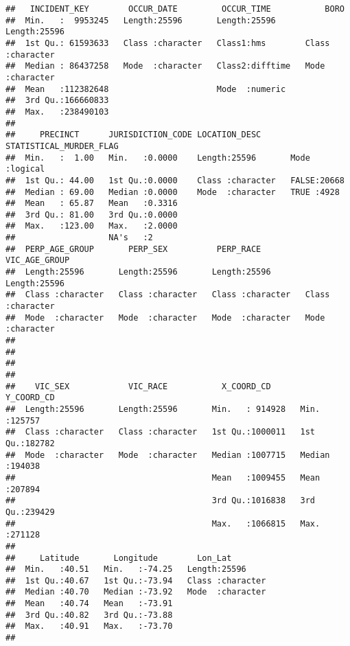 \documentclass[
]{article}
\begin{document}
\begin{verbatim}
##   INCIDENT_KEY        OCCUR_DATE         OCCUR_TIME           BORO          
##  Min.   :  9953245   Length:25596       Length:25596      Length:25596      
##  1st Qu.: 61593633   Class :character   Class1:hms        Class :character  
##  Median : 86437258   Mode  :character   Class2:difftime   Mode  :character  
##  Mean   :112382648                      Mode  :numeric                      
##  3rd Qu.:166660833                                                          
##  Max.   :238490103                                                          
##                                                                             
##     PRECINCT      JURISDICTION_CODE LOCATION_DESC      STATISTICAL_MURDER_FLAG
##  Min.   :  1.00   Min.   :0.0000    Length:25596       Mode :logical          
##  1st Qu.: 44.00   1st Qu.:0.0000    Class :character   FALSE:20668            
##  Median : 69.00   Median :0.0000    Mode  :character   TRUE :4928             
##  Mean   : 65.87   Mean   :0.3316                                              
##  3rd Qu.: 81.00   3rd Qu.:0.0000                                              
##  Max.   :123.00   Max.   :2.0000                                              
##                   NA's   :2                                                   
##  PERP_AGE_GROUP       PERP_SEX          PERP_RACE         VIC_AGE_GROUP     
##  Length:25596       Length:25596       Length:25596       Length:25596      
##  Class :character   Class :character   Class :character   Class :character  
##  Mode  :character   Mode  :character   Mode  :character   Mode  :character  
##                                                                             
##                                                                             
##                                                                             
##                                                                             
##    VIC_SEX            VIC_RACE           X_COORD_CD        Y_COORD_CD    
##  Length:25596       Length:25596       Min.   : 914928   Min.   :125757  
##  Class :character   Class :character   1st Qu.:1000011   1st Qu.:182782  
##  Mode  :character   Mode  :character   Median :1007715   Median :194038  
##                                        Mean   :1009455   Mean   :207894  
##                                        3rd Qu.:1016838   3rd Qu.:239429  
##                                        Max.   :1066815   Max.   :271128  
##                                                                          
##     Latitude       Longitude        Lon_Lat         
##  Min.   :40.51   Min.   :-74.25   Length:25596      
##  1st Qu.:40.67   1st Qu.:-73.94   Class :character  
##  Median :40.70   Median :-73.92   Mode  :character  
##  Mean   :40.74   Mean   :-73.91                     
##  3rd Qu.:40.82   3rd Qu.:-73.88                     
##  Max.   :40.91   Max.   :-73.70                     
## 
\end{verbatim}
\end{document}
